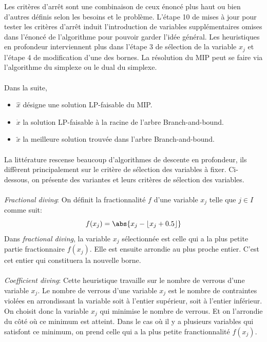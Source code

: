 \documentclass[12pt,a4paper,oneside]{book}
\theoremstyle{definition}
\DeclarePairedDelimiter\floor{\lfloor}{\rfloor}
\begin{document}
	Les critères d'arrêt sont une combinaison de ceux énoncé plus haut ou bien d'autres définis selon les besoins et le problème. L'étape 10 de mises à jour pour tester les critères d'arrêt induit l'introduction de variables supplémentaires omises dans l'énoncé de l'algorithme pour pouvoir garder l'idée général. Les heuristiques en profondeur interviennent plus dans l'étape 3 de sélection de la variable $x_j$ et l'étape 4 de modification d'une des bornes. La résolution du MIP peut se faire via l'algorithme du simplexe ou le dual du simplexe. 
	
	\paragraph{}
	Dans la suite, 
	\begin{itemize}
		\item $\hat{x}$ désigne une solution LP-faisable du MIP. 
		\item $\dot{x}$ la solution LP-faisable à la racine de l'arbre Branch-and-bound.
		\item $\tilde{x}$ la meilleure solution trouvée dans l'arbre Branch-and-bound.
	\end{itemize}
	

	\paragraph{}
	La littérature rescense beaucoup d'algorithmes de descente en profondeur, ils diffèrent principalement sur le critère de sélection des variables à fixer. Ci-dessous, on présente des variantes et leurs critères de sélection des variables.
	\paragraph{}
	\textit{Fractional diving}: On définit la fractionnalité $f$ d'une variable $x_j$ telle que $j \in I$ comme suit:
	\[
		f(x_j) = \abs{x_j - \floor{x_j+0.5}}
	\]
	Dans \textit{fractional diving}, la variable $x_j$ sélectionnée est celle qui a la plus petite partie fractionnaire $f(x_j)$. Elle est ensuite arrondie au plus proche entier. C'est cet entier qui constituera la nouvelle borne.

	\paragraph{}
	\textit{Coefficient diving}: Cette heuristique travaille sur le nombre de verrous d'une variable $x_j$. Le nombre de verrous d'une variable $x_j$ est le nombre de contraintes violées en arrondissant la variable soit à l'entier supérieur, soit à l'entier inférieur. On choisit donc la variable $x_j$ qui minimise le nombre de verrous. Et on l'arrondie du côté où ce minimum est atteint. Dans le cas où il y a plusieurs variables qui satisfont ce minimum, on prend celle qui a la plus petite franctionnalité $f(x_j)$.
\end{document}
